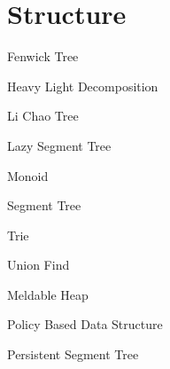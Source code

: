 \section{Structure}

Fenwick Tree


Heavy Light Decomposition


Li Chao Tree


Lazy Segment Tree





Monoid


Segment Tree


Trie


Union Find


Meldable Heap


Policy Based Data Structure


Persistent Segment Tree


